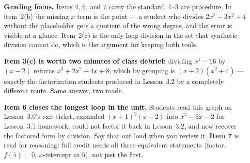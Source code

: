 \documentclass[10pt]{article}
\begin{document}
\begin{teachernote}
\textbf{Grading focus.} Items 4, 6, and 7 carry the standard; 1--3 are procedure. In item~2(b) the
missing $x$ term is the point --- a student who divides $2x^3-3x^2+4$ without the placeholder gets a
quotient of the wrong degree, and the error is visible at a glance. Item~2(c) is the only long
division in the set that synthetic division cannot do, which is the argument for keeping both tools.

\vspace{3pt}
\textbf{Item 3(c) is worth two minutes of class debrief:} dividing $x^4-16$ by $(x-2)$ returns
$x^3+2x^2+4x+8$, which by grouping is $(x+2)(x^2+4)$ --- exactly the factorization students produced
in Lesson~3.2 by a completely different route. Same answer, two roads.

\vspace{3pt}
\textbf{Item 6 closes the longest loop in the unit.} Students read this graph on Lesson~3.0's exit
ticket, expanded $(x+1)^2(x-2)$ into $x^3-3x-2$ for Lesson~3.1 homework, could not factor it back in
Lesson~3.2, and now recover the factored form by division. Say that out loud when you review it.
\textbf{Item 7} is read for reasoning: full credit needs all three equivalent statements (factor,
$f(5)=0$, $x$-intercept at $5$), not just the first.
\end{teachernote}
\end{document}
